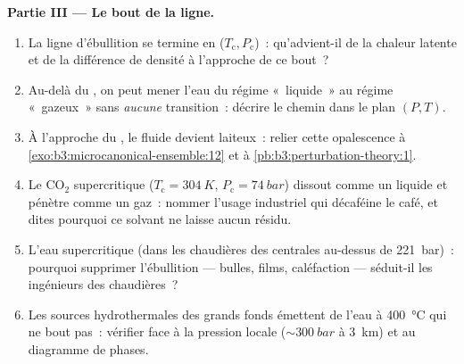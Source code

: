 \begin{problem}
\medskip\noindent\textbf{Partie III --- Le bout de la ligne.}
\begin{enumerate}[resume]
  \item La ligne d'ébullition se termine en ($T_{\text{c}},
        P_{\text{c}}$)~: qu'advient-il de la chaleur latente et de
        la différence de densité à l'approche de ce bout~?
  \item Au-delà du , on peut mener l'eau du régime
        «~liquide~» au régime «~gazeux~» sans \emph{aucune}
        transition~: décrire le chemin dans le plan $(P, T)$.
  \item À l'approche du , le fluide devient
        laiteux~: relier cette opalescence à
        \cref{exo:b3:microcanonical-ensemble:12} et à
        \cref{pb:b3:perturbation-theory:1}.
  \item Le CO$_2$ supercritique ($T_{\text{c}} = \qty{304}{K}$,
        $P_{\text{c}} = \qty{74}{bar}$) dissout comme un liquide et
        pénètre comme un gaz~: nommer l'usage industriel qui
        décaféine le café, et dites pourquoi ce solvant ne laisse
        aucun résidu.
  \item L'eau supercritique (dans les chaudières des centrales
        au-dessus de \qty{221}{bar})~: pourquoi supprimer
        l'ébullition --- bulles, films, caléfaction --- séduit-il
        les ingénieurs des chaudières~?
  \item Les sources hydrothermales des grands fonds émettent de
        l'eau à \qty{400}{\celsius} qui ne bout pas~: vérifier face
        à la pression locale ($\sim\qty{300}{bar}$ à \qty{3}{km})
        et au diagramme de phases.
\end{enumerate}


\end{problem}

